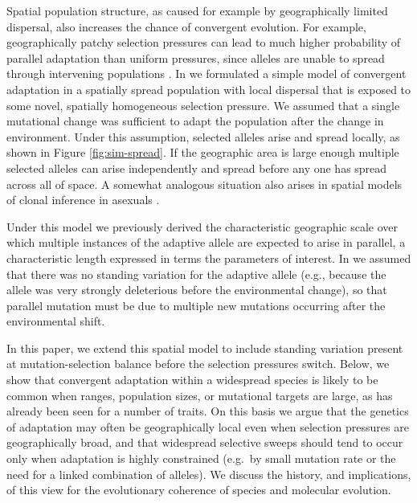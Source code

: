 \documentclass{article}
\begin{document}
Spatial population structure,
as caused for example by geographically limited dispersal, 
also increases the chance of convergent evolution. 
For example, 
geographically patchy selection pressures can lead to much higher probability of parallel adaptation than uniform pressures,
since alleles are unable to spread through intervening populations
\citep{RalphCoop:14}. 
In \citet{ralphcoop2010} we formulated a simple model of convergent adaptation in 
a spatially spread population with local dispersal
that is exposed to some novel, spatially homogeneous selection pressure.
We assumed that a single mutational change was sufficient to adapt
the population after the change in environment. Under this assumption,
selected alleles arise and spread locally, as shown in Figure \ref{fig:sim-spread}. 
If the geographic area is large enough multiple selected alleles can
arise independently and spread before any one has spread across all of space. 
A somewhat analogous situation also
arises in spatial models of clonal inference in asexuals \citep{gordo_adaptive_2006,martens_interfering_2011,otwinowski_clonal_2014}.





Under this model we previously derived the characteristic geographic scale over which 
multiple instances of the adaptive allele are expected to arise in parallel, 
a characteristic length expressed in terms the parameters of interest. 
In \citet{ralphcoop2010} we assumed that there was no standing variation for the adaptive
allele (e.g., because the allele was very strongly deleterious before the environmental change), 
so that parallel mutation must be due to multiple new mutations occurring after the environmental shift. 

In this paper, we extend this spatial model to include standing variation 
present at mutation-selection balance before the selection pressures switch.
Below,
we show that convergent adaptation within a widespread species is likely to be
common when ranges, population sizes, or mutational targets are large, as has already been seen for a number of traits. 
On this basis we argue 
that the genetics of adaptation may often be geographically local even
when selection pressures are geographically broad, 
and that widespread selective sweeps should tend to occur only
when adaptation is highly constrained (e.g.\ by small mutation rate or
the need for a linked combination of alleles).
We discuss the history, and implications, of this view for the evolutionary
coherence of species and molecular evolution.
\end{document}
